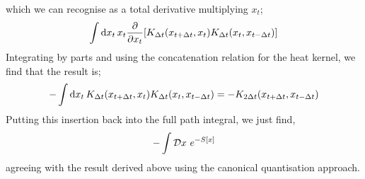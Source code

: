which we can recognise as a total derivative multiplying $x_t$;
\begin{equation*}
\int{\upd{x_t}x_t\frac{\del}{\del x_t}\left[K_{\Delta t}\left(x_{t + \Delta t}, x_t\right)K_{\Delta t}\left(x_{t}, x_{t - \Delta t}\right)\right]}
\end{equation*}
Integrating by parts and using the concatenation relation for the heat kernel, we find that the result is;
\begin{equation*}
-\int{\upd{x_t}K_{\Delta t}\left(x_{t + \Delta t}, x_t\right)K_{\Delta t}\left(x_t, x_{t - \Delta t}\right)} = -K_{2\Delta t}\left(x_{t + \Delta t}, x_{t - \Delta t}\right)
\end{equation*}
Putting this insertion back into the full path integral, we just find,
\begin{equation*}
-\int{\mathcal{D}x\,\, e^{-S[x]}}
\end{equation*}
agreeing with the result derived above using the canonical quantisation approach.

